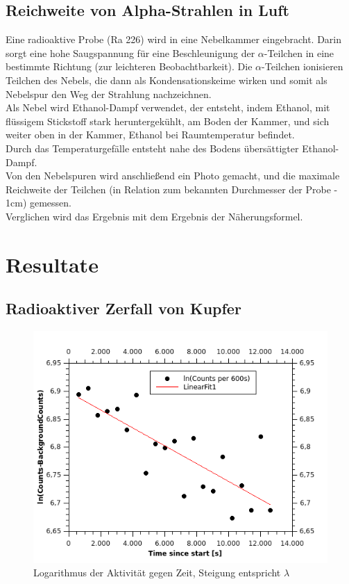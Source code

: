 \documentclass[12pt,a4paper]{article}
\begin{document}
\begin{multicols}{2}
\subsection{Reichweite von Alpha-Strahlen in Luft}

Eine radioaktive Probe (Ra 226) wird in eine Nebelkammer eingebracht. Darin sorgt eine hohe Saugspannung für eine Beschleunigung der $\alpha$-Teilchen in eine bestimmte Richtung (zur leichteren Beobachtbarkeit). Die $\alpha$-Teilchen ionisieren Teilchen des Nebels, die dann als Kondensationskeime wirken und somit als Nebelspur den Weg der Strahlung nachzeichnen.\\
Als Nebel wird Ethanol-Dampf verwendet, der entsteht, indem Ethanol, mit flüssigem Stickstoff stark heruntergekühlt, am Boden der Kammer, und sich weiter oben in der Kammer, Ethanol bei Raumtemperatur befindet.\\
Durch das Temperaturgefälle entsteht nahe des Bodens übersättigter Ethanol-Dampf.\\

\noindent Von den Nebelspuren wird anschließend ein Photo gemacht, und die maximale Reichweite der Teilchen (in Relation zum bekannten Durchmesser der Probe - 1cm) gemessen.\\
Verglichen wird das Ergebnis mit dem Ergebnis der Näherungsformel.


\section{Resultate}
\subsection{Radioaktiver Zerfall von Kupfer}
\end{multicols}
\begin{figure}[H]
	\centering
	\includegraphics[scale=2.5]{./figures/kupfer_zerfall_ergebnis.png}
	\caption{Logarithmus der Aktivität gegen Zeit, Steigung entspricht $\lambda$}
	\label{fig:kupferzerfall_erg}
\end{figure}
\end{document}
